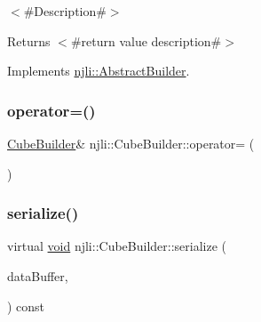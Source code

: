 $<$\#\+Description\#$>$

\begin{DoxyReturn}{Returns}
$<$\#return value description\#$>$ 
\end{DoxyReturn}


Implements \mbox{\hyperlink{classnjli_1_1_abstract_builder_a3e6e553e06d1ca30517ad5fb0bd4d000}{njli\+::\+Abstract\+Builder}}.

\mbox{\label{classnjli_1_1_cube_builder_a5599555bddabaf1d20bfb71cc0e4ed40}} 
\subsubsection{\texorpdfstring{operator=()}{operator=()}}
{\footnotesize\ttfamily \mbox{\hyperlink{classnjli_1_1_cube_builder}{Cube\+Builder}}\& njli\+::\+Cube\+Builder\+::operator= (\begin{DoxyParamCaption}\item[{const \mbox{\hyperlink{classnjli_1_1_cube_builder}{Cube\+Builder}} \&}]{ }\end{DoxyParamCaption})\hspace{0.3cm}{\ttfamily [protected]}}

\mbox{\label{classnjli_1_1_cube_builder_ab46da5fa371af052900e2cb9df570246}} 
\subsubsection{\texorpdfstring{serialize()}{serialize()}}
{\footnotesize\ttfamily virtual \mbox{\hyperlink{_thread_8h_af1e856da2e658414cb2456cb6f7ebc66}{void}} njli\+::\+Cube\+Builder\+::serialize (\begin{DoxyParamCaption}\item[{\mbox{\hyperlink{_thread_8h_af1e856da2e658414cb2456cb6f7ebc66}{void}} $\ast$}]{data\+Buffer,  }\item[{bt\+Serializer $\ast$}]{ }\end{DoxyParamCaption}) const\hspace{0.3cm}{\ttfamily [virtual]}}



